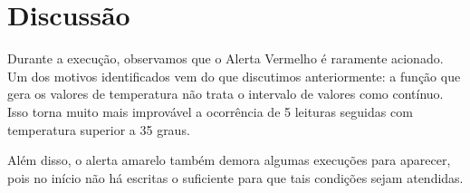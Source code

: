 \documentclass[12pt]{article}
\begin{document}
	\newpage
	\section{Discussão}
	
	Durante a execução, observamos que o Alerta Vermelho
	é raramente acionado. Um dos motivos identificados
	vem do que discutimos anteriormente: a função que
	gera os valores de temperatura não trata o intervalo
	de valores como contínuo. Isso torna muito mais improvável
	a ocorrência de 5 leituras seguidas com temperatura superior
	a 35 graus.
	
	Além disso, o alerta amarelo também demora algumas
	execuções para aparecer, pois no início não há escritas
	o suficiente para que tais condições sejam atendidas.
	
\end{document}
